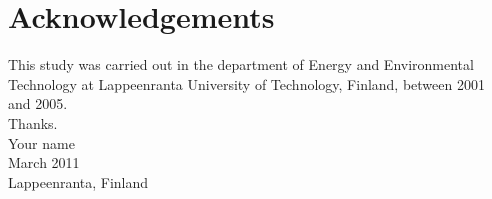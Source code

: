 \section*{Acknowledgements}

This study was carried out in the department of Energy and
Environmental Technology at Lappeenranta University of Technology,
Finland, between 2001 and 2005.\\

Thanks.\\

Your name\\
March 2011\\
Lappeenranta, Finland\\
